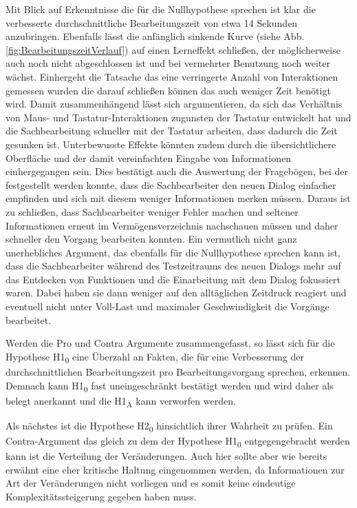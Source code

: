 Mit Blick auf Erkenntnisse die für die Nullhypothese sprechen ist klar die verbesserte durchschnittliche Bearbeitungszeit von etwa 14 Sekunden anzubringen. Ebenfalls lässt die anfänglich sinkende Kurve (siehe Abb. \ref{fig:BearbeitungszeitVerlauf}) auf einen Lerneffekt schließen, der möglicherweise auch noch nicht abgeschlossen ist und bei vermehrter Benutzung noch weiter wächst. Einhergeht die Tatsache das eine verringerte Anzahl von Interaktionen gemessen wurden die darauf schließen können das auch weniger Zeit benötigt wird. Damit zusammenhängend lässt sich argumentieren, da sich das Verhältnis von Maus- und Tastatur-Interaktionen zugunsten der Tastatur entwickelt hat und die Sachbearbeitung schneller mit der Tastatur arbeiten, dass dadurch die Zeit gesunken ist. Unterbewusste Effekte könnten zudem durch die übersichtlichere Oberfläche und der damit vereinfachten Eingabe von Informationen einhergegangen sein. Dies bestätigt auch die Auswertung der Fragebögen, bei der festgestellt werden konnte, dass die Sachbearbeiter den neuen Dialog einfacher empfinden und sich mit diesem weniger Informationen merken müssen. Daraus ist zu schließen, dass Sachbearbeiter weniger Fehler machen und seltener Informationen erneut im Vermögensverzeichnis nachschauen müssen und daher schneller den Vorgang bearbeiten konnten. Ein vermutlich nicht ganz unerhebliches Argument, das ebenfalls für die Nullhypothese sprechen kann ist, dass die Sachbearbeiter während des Testzeitraums des neuen Dialogs mehr auf das Entdecken von Funktionen und die Einarbeitung mit dem Dialog fokussiert waren. Dabei haben sie dann weniger auf den alltäglichen Zeitdruck reagiert und eventuell nicht unter Voll-Last und maximaler Geschwindigkeit die Vorgänge bearbeitet.

Werden die Pro und Contra Argumente zusammengefasst, so lässt sich für die Hypothese H1\textsubscript{0} eine Überzahl an Fakten, die für eine Verbesserung der durchschnittlichen Bearbeitungszeit pro Bearbeitungsvorgang sprechen, erkennen. Demnach kann H1\textsubscript{0} fast uneingeschränkt bestätigt werden und wird daher als belegt anerkannt und die H1\textsubscript{A} kann verworfen werden.

Als nächstes ist die Hypothese H2\textsubscript{0} hinsichtlich ihrer Wahrheit zu prüfen. Ein Contra-Argument das gleich zu dem der Hypothese H1\textsubscript{0} entgegengebracht werden kann ist die Verteilung der Veränderungen. Auch hier sollte aber wie bereits erwähnt eine eher kritische Haltung eingenommen werden, da Informationen zur Art der Veränderungen nicht vorliegen und es somit keine eindeutige Komplexitätssteigerung gegeben haben muss. 

